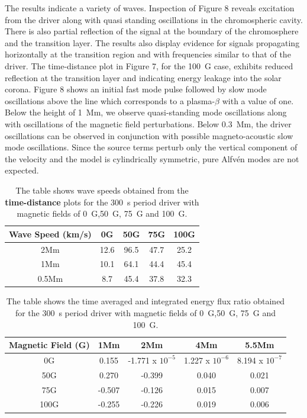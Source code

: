 \documentclass[physics,article,submit,pdftex,moreauthors]{Definitions/mdpi}
\begin{document}
The results indicate a variety of waves. Inspection of Figure 8 reveals excitation from the driver along with quasi standing oscillations in the chromospheric cavity. There is also partial reflection of the signal at the boundary of the chromosphere and the transition layer. The results also display evidence for signals propagating horizontally at the transition region and with frequencies similar to that of the driver. The time-distance plot in Figure 7, for the 100~G case, exhibits reduced reflection at the transition layer and indicating energy leakage into the solar corona. Figure 8 shows an initial fast mode pulse followed by slow mode oscillations above the line which corresponds to a plasma-$\beta$ with a value of one. Below the height of 1~Mm, we observe quasi-standing mode oscillations along with oscillations of the magnetic field perturbations. Below 0.3~Mm, the driver oscillations can be observed in conjunction with possible magneto-acoustic slow mode oscillations. Since the source terms perturb only the vertical component of the velocity and the model is cylindrically symmetric, pure Alfv\'en modes are not expected.



\begin{table}\label{wavespeeds}
\centering
\begin{tabular}{c c c c c}
\hline
Wave Speed (km/s)   &  0G  &  50G &  75G & 100G\\
\hline
2Mm & 12.6  &   96.5       &   47.7      &  25.2     \\
\hline
1Mm & 10.1  &    64.1      &   44.4     &   45.4      \\
\hline
0.5Mm & 8.7  &   45.4      &   37.8      &   32.3    \\
\hline

\end{tabular} 
\caption{The table shows wave speeds obtained from the {\bf time-distance} plots for the 300~s period driver with magnetic fields of 0~G,50~G, 75~G and 100~G.}
\label{Tablewavespeeds_300s}
\end{table}

\begin{table}\label{energyflux}
\centering
\begin{tabular}{c c c c c}
\hline
Magnetic Field (G)   &  1Mm  &  2Mm &  4Mm & 5.5Mm \\
\hline
0G & 0.155  &    -1.771 x $10^{-5}$      &   1.227 x $10^{-6}$     &   8.194 x $10^{-7}$      \\
\hline
50G & 0.270  &   -0.399       &   0.040      &  0.021     \\
\hline
75G & -0.507  &    -0.126      &   0.015     &   0.007      \\
\hline
100G & -0.255  &   -0.226      &   0.019      &   0.006    \\
\hline

\end{tabular} 
\caption{The table shows the time averaged and integrated energy flux ratio obtained  for the 300~s period driver with magnetic fields of 0~G,50~G, 75~G and 100~G.}
\label{energyfluxratio}
\end{table}
\end{document}
